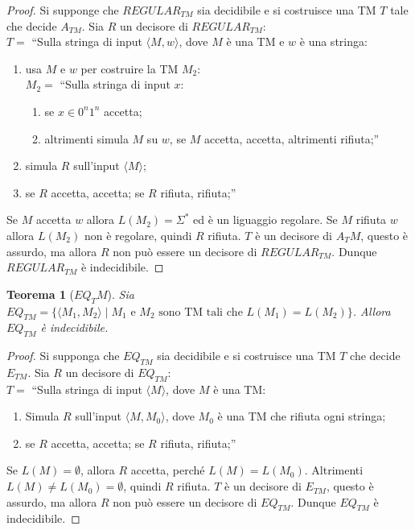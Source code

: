 \documentclass[11pt]{article}
\newtheorem{theorem}{Teorema}[section]
\newtheorem{proof}{Dimostrazione}[section]
\begin{document}
\begin{proof}
	Si supponge che $REGULAR_{TM}$ sia decidibile e si costruisce una TM $T$
	tale che decide $A_{TM}$. Sia $R$ un decisore di $REGULAR_{TM}$:\\

	$T = $ ``Sulla stringa di input $\langle M, w \rangle$, dove $M$ è una TM e
	$w$ è una stringa:
	\begin{enumerate}
		\item usa $M$ e $w$ per costruire la TM $M_2$:\\

			$M_2 = $ ``Sulla stringa di input $x$:
			\begin{enumerate}
				\item se $x \in 0^n1^n$ accetta;
				\item altrimenti simula $M$ su $w$, se $M$ accetta, accetta,
					altrimenti rifiuta;''
			\end{enumerate}

		\item simula $R$ sull'input $\langle M \rangle$;

		\item se $R$ accetta, accetta; se $R$ rifiuta, rifiuta;''
	\end{enumerate}

	Se $M$ accetta $w$ allora $L(M_2) = \Sigma^*$ ed è un liguaggio regolare. Se
	$M$ rifiuta $w$ allora $L(M_2)$ non è regolare, quindi $R$ rifiuta. $T$ è un 
	decisore di $A_TM$, questo è assurdo, ma allora $R$ non può essere un
	decisore di $REGULAR_{TM}$. Dunque $REGULAR_{TM}$ è indecidibile.
\end{proof}

\begin{theorem}[$EQ_TM$]
	Sia $EQ_{TM} = \{\langle M_1, M_2 \rangle \mid M_1 \text{ e } M_2 \text{ sono
	TM tali che } L(M_1) = L(M_2)\}$. Allora $EQ_{TM}$ è indecidibile.
\end{theorem}

\begin{proof}
	Si supponga che $EQ_{TM}$ sia decidibile e si costruisce una TM $T$ che
	decide $E_{TM}$. Sia $R$ un decisore di $EQ_{TM}$:\\

	$T = $ ``Sulla stringa di input $\langle M \rangle$, dove $M$ è una TM:
	\begin{enumerate}
		\item Simula $R$ sull'input $\langle M, M_0 \rangle$, dove $M_0$ è una
			TM che rifiuta ogni stringa;
		\item se $R$ accetta, accetta; se $R$ rifiuta, rifiuta;''
	\end{enumerate}

	Se $L(M) = \emptyset$, allora $R$ accetta, perché $L(M) = L(M_0)$.
	Altrimenti $L(M) \neq L(M_0) = \emptyset$, quindi $R$ rifiuta. $T$ è un 
	decisore di $E_{TM}$, questo è assurdo, ma allora $R$ non può essere un
	decisore di $EQ_{TM}$. Dunque $EQ_{TM}$ è indecidibile.
\end{proof}
\end{document}
